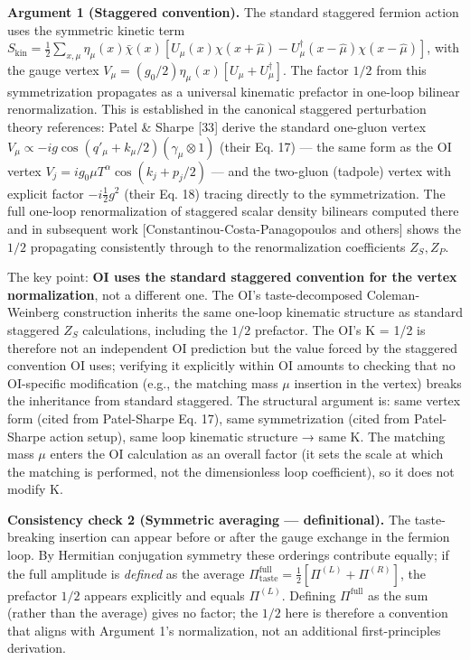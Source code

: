 \documentclass[
]{article}
\begin{document}
\textbf{Argument 1 (Staggered convention).} The standard staggered
fermion action uses the symmetric kinetic term
\(S_{\text{kin}} = \tfrac{1}{2}\sum_{x,\mu}\eta_\mu(x)\bar\chi(x)[U_\mu(x)\chi(x+\hat\mu) - U_\mu^\dagger(x-\hat\mu)\chi(x-\hat\mu)]\),
with the gauge vertex
\(V_\mu = (g_0/2)\eta_\mu(x)[U_\mu + U_\mu^\dagger]\). The factor
\(1/2\) from this symmetrization propagates as a universal kinematic
prefactor in one-loop bilinear renormalization. This is established in
the canonical staggered perturbation theory references: Patel \& Sharpe
{[}33{]} derive the standard one-gluon vertex
\(V_\mu \propto -ig\cos(q'_\mu + k_\mu/2)(\gamma_\mu \otimes 1)\) (their
Eq. 17) --- the same form as the OI vertex
\(V_j = ig_0\mu T^\alpha\cos(k_j + p_j/2)\) --- and the two-gluon
(tadpole) vertex with explicit factor \(-i\tfrac{1}{2}g^2\) (their Eq.
18) tracing directly to the symmetrization. The full one-loop
renormalization of staggered scalar density bilinears computed there and
in subsequent work {[}Constantinou-Costa-Panagopoulos and others{]}
shows the \(1/2\) propagating consistently through to the
renormalization coefficients \(Z_S, Z_P\).

The key point: \textbf{OI uses the standard staggered convention for the
vertex normalization}, not a different one. The OI's taste-decomposed
Coleman-Weinberg construction inherits the same one-loop kinematic
structure as standard staggered \(Z_S\) calculations, including the
\(1/2\) prefactor. The OI's K = 1/2 is therefore not an independent OI
prediction but the value forced by the staggered convention OI uses;
verifying it explicitly within OI amounts to checking that no
OI-specific modification (e.g., the matching mass \(\mu\) insertion in
the vertex) breaks the inheritance from standard staggered. The
structural argument is: same vertex form (cited from Patel-Sharpe Eq.
17), same symmetrization (cited from Patel-Sharpe action setup), same
loop kinematic structure → same K. The matching mass \(\mu\) enters the
OI calculation as an overall factor (it sets the scale at which the
matching is performed, not the dimensionless loop coefficient), so it
does not modify K.

\textbf{Consistency check 2 (Symmetric averaging --- definitional).} The
taste-breaking insertion can appear before or after the gauge exchange
in the fermion loop. By Hermitian conjugation symmetry these orderings
contribute equally; if the full amplitude is \emph{defined} as the
average
\(\Pi_{\text{taste}}^{\text{full}} = \tfrac{1}{2}[\Pi^{(L)} + \Pi^{(R)}]\),
the prefactor \(1/2\) appears explicitly and equals \(\Pi^{(L)}\).
Defining \(\Pi^{\text{full}}\) as the sum (rather than the average)
gives no factor; the \(1/2\) here is therefore a convention that aligns
with Argument 1's normalization, not an additional first-principles
derivation.
\end{document}
